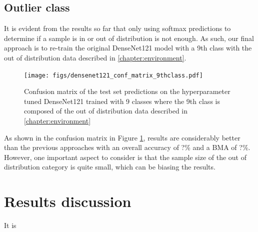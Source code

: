     \subsection{Outlier class}
        It is evident from the results so far that only using softmax predictions to determine if a sample is in or out of distribution is not enough. As such, our final approach is to re-train the original DenseNet121 model with a 9th class with the out of distribution data described in \autoref{chapter:environment}. \par
        
        \begin{figure}[ht]
            \centering
            \texttt{[image: figs/densenet121\_conf\_matrix\_9thclass.pdf]}
            \caption{Confusion matrix of the test set predictions on the hyperparameter tuned DenseNet121 trained with 9 classes where the 9th class is composed of the out of distribution data described in \autoref{chapter:environment}}
            \label{fig:densenet121_conf_matrix_9thclass}
        \end{figure}
        
        As shown in the confusion matrix in Figure \ref{fig:densenet121_conf_matrix_9thclass}, results are considerably better than the previous approaches with an overall accuracy of ?\% and a \ac{BMA} of ?\%. However, one important aspect to consider is that the sample size of the out of distribution category is quite small, which can be biasing the results. \par

\section{Results discussion} 
\label{section:discussion}
It is 